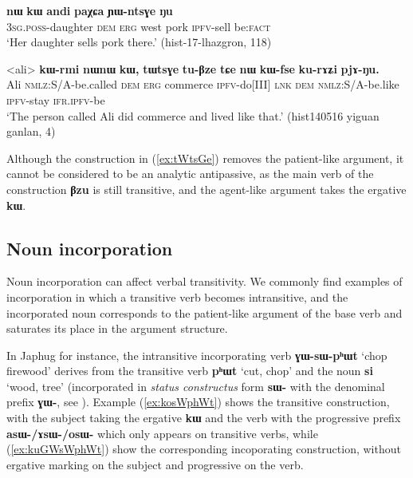 \documentclass[oneside,a4paper,11pt]{article}
\newcommand{\ipa}[1]{{\phon\textbf{#1}}}
\begin{document}
\begin{exe}
\ex \label{ex:YWntsGe}
\gll \ipa{ɯ-me} 	\ipa{nɯ} 	\ipa{kɯ} 	\ipa{andi} 	\ipa{paχɕa} 	\ipa{ɲɯ-ntsɣe} 	\ipa{ŋu} \\
\textsc{3sg.poss}-daughter \textsc{dem} \textsc{erg} west pork \textsc{ipfv}-sell be:\textsc{fact} \\
\glt `Her daughter sells pork there.' (hist-17-lhazgron, 118)
\end{exe}


\begin{exe}
\ex \label{ex:tWtsGe}
\gll <ali> 	\ipa{kɯ-rmi} 	\ipa{nɯnɯ} 	\ipa{kɯ,} 	\ipa{tɯtsɣe} 	\ipa{tu-βze} 	\ipa{tɕe} 	\ipa{nɯ} 	\ipa{kɯ-fse} 	\ipa{ku-rɤʑi} 	\ipa{pjɤ-ŋu.}  \\
Ali \textsc{nmlz}:S/A-be.called \textsc{dem} \textsc{erg} commerce \textsc{ipfv}-do[III] \textsc{lnk} \textsc{dem} \textsc{nmlz}:S/A-be.like \textsc{ipfv}-stay \textsc{ifr.ipfv}-be \\
\glt `The person called Ali did commerce and lived like that.' (hist140516 yiguan ganlan, 4)
\end{exe}

Although the construction in (\ref{ex:tWtsGe}) removes the patient-like argument, it cannot be considered to be an analytic antipassive, as the main verb of the construction \ipa{βzu} is still transitive, and the agent-like argument takes the ergative \ipa{kɯ}. 


\subsection{Noun incorporation} \label{sec:incorp}
Noun incorporation can affect verbal transitivity. We commonly find examples of incorporation in which a transitive verb becomes intransitive, and the incorporated noun corresponds to the patient-like argument of the base verb and saturates its place in the argument structure.

In Japhug for instance, the intransitive incorporating verb \ipa{ɣɯ-sɯ-pʰɯt} `chop firewood' derives from the transitive verb \ipa{pʰɯt} `cut, chop' and the noun  \ipa{si} `wood, tree' (incorporated in \textit{status constructus} form \ipa{sɯ-} with the denominal prefix \ipa{ɣɯ-}, see  \citealt{jacques12incorp}). Example (\ref{ex:kosWphWt}) shows the transitive construction, with the subject taking the ergative \ipa{kɯ} and the verb with the progressive prefix \ipa{asɯ-/ɤsɯ-/osɯ-} which only appears on transitive verbs, while (\ref{ex:kuGWsWphWt}) show the corresponding incoporating construction, without ergative marking on the subject and progressive on the verb.
\end{document}
